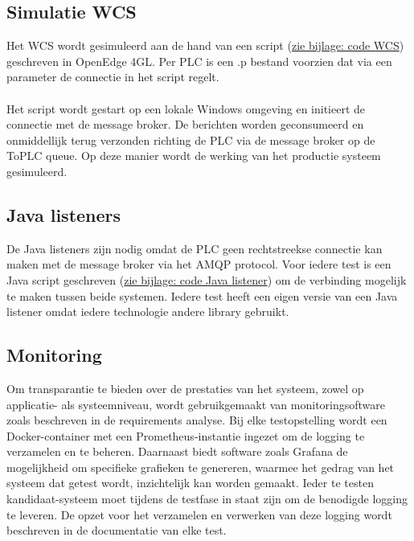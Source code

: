 \subsection{Simulatie WCS}
Het WCS wordt gesimuleerd aan de hand van een script (\hyperref[listing:code_wcs]{zie bijlage: code WCS}) geschreven in OpenEdge 4GL.
Per PLC is een .p bestand voorzien dat via een parameter de connectie in het script regelt.
\\\\
Het script wordt gestart op een lokale Windows omgeving en initieert de connectie met de message broker.
De berichten worden geconsumeerd en onmiddellijk terug verzonden richting de PLC via de message broker op de ToPLC queue.
Op deze manier wordt de werking van het productie systeem gesimuleerd.

\subsection{Java listeners}
De Java listeners zijn nodig omdat de PLC geen rechtstreekse connectie kan maken met de message broker via het AMQP protocol.
Voor iedere test is een Java script geschreven (\hyperref[sec:code_java_listener]{zie bijlage: code Java listener}) om de verbinding mogelijk te maken tussen beide systemen.
Iedere test heeft een eigen versie van een Java listener omdat iedere technologie andere library gebruikt.

\subsection{Monitoring}
Om transparantie te bieden over de prestaties van het systeem, zowel op applicatie- als systeemniveau, 
wordt gebruikgemaakt van monitoringsoftware zoals beschreven in de requirements analyse.
Bij elke testopstelling wordt een Docker-container met een Prometheus-instantie ingezet om de logging te verzamelen en te beheren.
Daarnaast biedt software zoals Grafana de mogelijkheid om specifieke grafieken te genereren, 
waarmee het gedrag van het systeem dat getest wordt, inzichtelijk kan worden gemaakt.
Ieder te testen kandidaat-systeem moet tijdens de testfase in staat zijn om de benodigde logging te leveren. 
De opzet voor het verzamelen en verwerken van deze logging wordt beschreven in de documentatie van elke test.
\newpage

